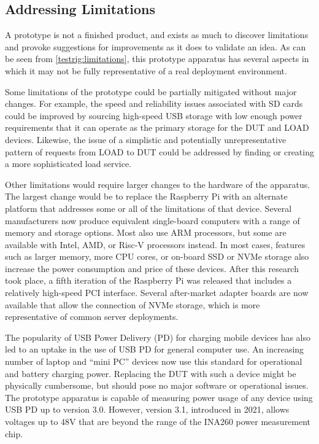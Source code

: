 \subsection{Addressing Limitations}

A prototype is not a finished product, and exists as much to discover limitations and provoke suggestions for improvements as it does to validate an idea. As can be seen from \autoref{testrig:limitations}, this prototype apparatus has several aspects in which it may not be fully representative of a real deployment environment.

Some limitations of the prototype could be partially mitigated without major changes. For example, the speed and reliability issues associated with SD cards could be improved by sourcing high-speed USB storage with low enough power requirements that it can operate as the primary storage for the DUT and LOAD devices. Likewise, the issue of a simplistic and potentially unrepresentative pattern of requests from LOAD to DUT could be addressed by finding or creating a more sophisticated load service.

Other limitations would require larger changes to the hardware of the apparatus. The largest change would be to replace the Raspberry Pi with an alternate platform that addresses some or all of the limitations of that device. Several manufacturers now produce equivalent single-board computers with a range of memory and storage options. Most also use ARM processors, but some are available with Intel, AMD, or Risc-V processors instead. In most cases, features such as larger memory, more CPU cores, or on-board SSD or NVMe storage also increase the power consumption and price of these devices. After this research took place, a fifth iteration of the Raspberry Pi was released that includes a relatively high-speed PCI interface. Several after-market adapter boards are now available that allow the connection of NVMe storage, which is more representative of common server deployments.

The popularity of USB Power Delivery (PD) for charging mobile devices has also led to an uptake in the use of USB PD for general computer use. An increasing number of laptop and \enquote{mini PC} devices now use this standard for operational and battery charging power. Replacing the DUT with such a device might be physically cumbersome, but should pose no major software or operational issues. The prototype apparatus is capable of measuring power usage of any device using USB PD up to version 3.0. However, version 3.1, introduced in 2021, allows voltages up to 48V that are beyond the range of the INA260 power measurement chip.

